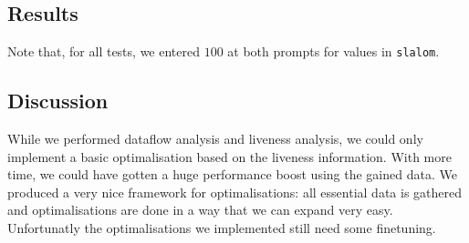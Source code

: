 
\subsection{Results}

Note that, for all tests, we entered $100$ at both prompts for values in
\texttt{slalom}.



\subsection{Discussion}
While we performed dataflow analysis and liveness analysis, we could only 
implement a basic optimalisation based on the liveness information. With more
time, we could have gotten a huge performance boost using the gained data. We 
produced a very nice framework for optimalisations: all essential data is
gathered and optimalisations are done in a way that we can expand very easy. 
Unfortunatly the optimalisations we implemented still need some finetuning.

